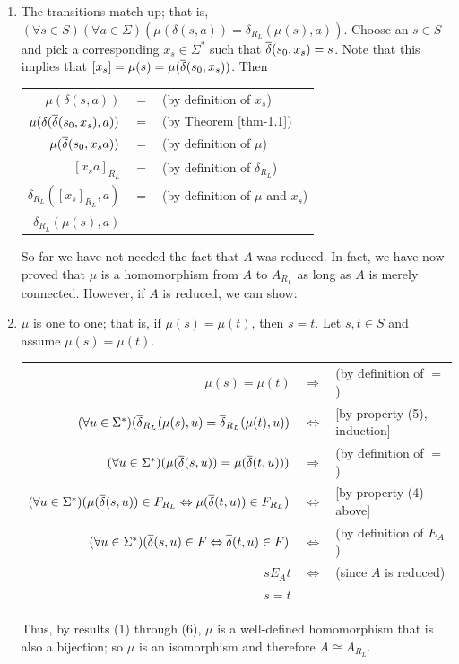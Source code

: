 \begin{thm}
\begin{enumerate}
\item The transitions match up; that is,
$(\forall s \in S)(\forall a \in \Sigma)(\mu(\delta(s,a)) =
\delta_{R_L}(\mu(s),a))$. Choose an $s \in S$ and pick a corresponding
$x_s \in \Sigma^*$ such that $\overline{\delta}(s_0,x_s) = s$. Note that this implies that
$[x_s]=\mu(s)=\mu(\overline{\delta}(s_0,x_s))$. Then
\begin{center}
\begin{tabular}{rcl}
$\mu(\delta(s,a))$ & $=$ & (by definition of $x_s$) \\
$\mu(\delta(\overline{\delta}(s_0,x_s),a))$ & $=$ & (by Theorem \ref{thm-1.1}) \\
$\mu(\overline{\delta}(s_0,x_s a))$ & $=$ & (by definition of $\mu$) \\
$[x_s a]_{R_L}$ & $=$ & (by definition of $\delta_{R_L}$) \\
$\delta_{R_L}([x_s]_{R_L},a)$ & $=$ & (by definition of $\mu$ and $x_s$) \\
$\delta_{R_L}(\mu(s),a)$ &&
\end{tabular}
\end{center}
So far we have not needed the fact that $A$ was reduced. In fact, we have now
proved that $\mu$ is a homomorphism from $A$ to $A_{R_L}$ as long as $A$ is
merely connected. However, if $A$ is reduced, we can show:

\item $\mu$ is one to one; that is, if $\mu(s)=\mu(t)$, then $s=t$. Let
$s,t \in S$ and assume $\mu(s)=\mu(t)$.
\begin{center}
\begin{tabular}{rcl}
$\mu(s) = \mu(t)$ & $\Rightarrow$ & (by definition of $=$) \\
$(\forall u \in \Sigma^*)(\overline{\delta}_{R_L}(\mu(s),u)=\overline{\delta}_{R_L}(\mu(t),u))$ &
$\Leftrightarrow$ & [by property (5), induction] \\
$(\forall u \in \Sigma^*)(\mu(\overline{\delta}(s,u))=\mu(\overline{\delta}(t,u)))$ & $\Rightarrow$ &
(by definition of $=$) \\
$(\forall u \in \Sigma^*)(\mu(\overline{\delta}(s,u))\in F_{R_L} \Leftrightarrow
\mu(\overline{\delta}(t,u))\in F_{R_L})$ & $\Leftrightarrow$ & [by property (4) above] \\
$(\forall u \in \Sigma^*)(\overline{\delta}(s,u) \in F \Leftrightarrow \overline{\delta}(t,u) \in F)$ &
$\Leftrightarrow$ & (by definition of $E_A$) \\
$s E_A t$ & $\Leftrightarrow$ & (since $A$ is reduced) \\
$s = t$ &&
\end{tabular}
\end{center}
Thus, by results (1) through (6), $\mu$ is a well-defined homomorphism that is
also a bijection; so $\mu$ is an isomorphism and therefore $A \cong A_{R_L}$.
\end{enumerate}
\end{thm}

